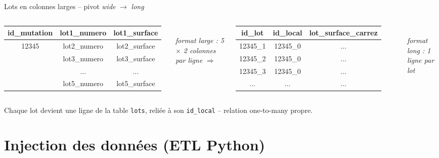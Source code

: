 \documentclass[12pt,aspectratio=169]{beamer}
\begin{document}
\begin{frame}{Lots en colonnes larges -- pivot \textit{wide} $\to$ \textit{long}}
  \centering
  \begin{columns}[c]
      \centering
      \footnotesize
      \begin{tabular}{|c|c|c|}
        \hline
        \textbf{id\_mutation} & \textbf{lot1\_numero} & \textbf{lot1\_surface} \\
        \hline
        \multirow{4}{*}{12345} & lot2\_numero & lot2\_surface \\
        \cline{2-3}
        & lot3\_numero & lot3\_surface \\
        \cline{2-3}
        & ... & ... \\
        \cline{2-3}
        & lot5\_numero & lot5\_surface \\
        \hline
      \end{tabular}\\[0.8em]
      \textit{format large : 5 $\times$ 2 colonnes par ligne}
      \centering
      \Large $\Longrightarrow$
      \centering
      \footnotesize
      \begin{tabular}{|c|c|c|}
        \hline
        \textbf{id\_lot} & \textbf{id\_local} & \textbf{lot\_surface\_carrez} \\
        \hline
        12345\_1 & 12345\_0 & ... \\\hline
        12345\_2 & 12345\_0 & ... \\\hline
        12345\_3 & 12345\_0 & ... \\\hline
        ... & ... & ... \\\hline
      \end{tabular}\\[0.8em]
      \textit{format long : 1 ligne par lot}
  \end{columns}

  \vspace{1em}
  \small
  Chaque lot devient une ligne de la table \texttt{lots}, reliée à son
  \texttt{id\_local} -- relation one-to-many propre.
\end{frame}

\section{Injection des données (ETL Python)}
\end{document}

